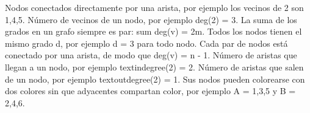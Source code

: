 {}\markdownRendererHardLineBreak
{}Nodos conectados directamente por una arista, por ejemplo los vecinos de \markdownRendererDollarSign{}2\markdownRendererDollarSign{} son \markdownRendererDollarSign{}\markdownRendererLeftBrace{}1,4,5\markdownRendererRightBrace{}\markdownRendererDollarSign{}.\markdownRendererParagraphSeparator
{}\markdownRendererHardLineBreak
{}Número de vecinos de un nodo, por ejemplo \markdownRendererDollarSign{}\markdownRendererBackslash{}deg(2) = 3\markdownRendererDollarSign{}.\markdownRendererParagraphSeparator
{}\markdownRendererHardLineBreak
{}La suma de los grados en un grafo siempre es par: \markdownRendererDollarSign{}\markdownRendererBackslash{}sum \markdownRendererBackslash{}deg(v) = 2m\markdownRendererDollarSign{}.\markdownRendererParagraphSeparator
{}\markdownRendererHardLineBreak
{}Todos los nodos tienen el mismo grado \markdownRendererDollarSign{}d\markdownRendererDollarSign{}, por ejemplo \markdownRendererDollarSign{}d = 3\markdownRendererDollarSign{} para todo nodo.\markdownRendererParagraphSeparator
{}\markdownRendererHardLineBreak
{}Cada par de nodos está conectado por una arista, de modo que \markdownRendererDollarSign{}\markdownRendererBackslash{}deg(v) = n - 1\markdownRendererDollarSign{}.\markdownRendererParagraphSeparator
{}\markdownRendererHardLineBreak
{}Número de aristas que llegan a un nodo, por ejemplo \markdownRendererDollarSign{}\markdownRendererBackslash{}text\markdownRendererLeftBrace{}indegree\markdownRendererRightBrace{}(2) = 2\markdownRendererDollarSign{}.\markdownRendererParagraphSeparator
{}\markdownRendererHardLineBreak
{}Número de aristas que salen de un nodo, por ejemplo \markdownRendererDollarSign{}\markdownRendererBackslash{}text\markdownRendererLeftBrace{}outdegree\markdownRendererRightBrace{}(2) = 1\markdownRendererDollarSign{}.\markdownRendererParagraphSeparator
{}\markdownRendererHardLineBreak
{}Sus nodos pueden colorearse con dos colores sin que adyacentes compartan color, por ejemplo \markdownRendererDollarSign{}A = \markdownRendererLeftBrace{}1,3,5\markdownRendererRightBrace{}\markdownRendererDollarSign{} y \markdownRendererDollarSign{}B = \markdownRendererLeftBrace{}2,4,6\markdownRendererRightBrace{}\markdownRendererDollarSign{}.\markdownRendererParagraphSeparator

